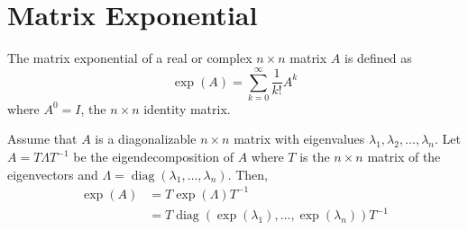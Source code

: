 \section{Matrix Exponential}

\begin{defn}
The matrix exponential of a real or complex $n \times n$ matrix $A$ is defined as
$$
\exp(A) = \sum_{k = 0}^\infty \frac{1}{k!} A^k
$$
where $A^0 = I$, the $n \times n$ identity matrix.
\end{defn}

\begin{theorem} \label{thm:eigen_matrix_exp}
Assume that $A$ is a diagonalizable $n \times n$ matrix with eigenvalues $\lambda_1, \lambda_2, \ldots, \lambda_n$.
Let $A = T \Lambda T^{-1}$ be the eigendecomposition of $A$ where $T$ is the $n \times n$ matrix of the eigenvectors and $\Lambda = \operatorname{diag}(\lambda_1, \ldots, \lambda_n)$.
Then,
\begin{align*}
    \exp(A) &= T \exp(\Lambda) T^{-1}\\
    &= T \operatorname{diag}(\exp(\lambda_1), \ldots, \exp(\lambda_n)) T^{-1}
\end{align*}
\end{theorem}
